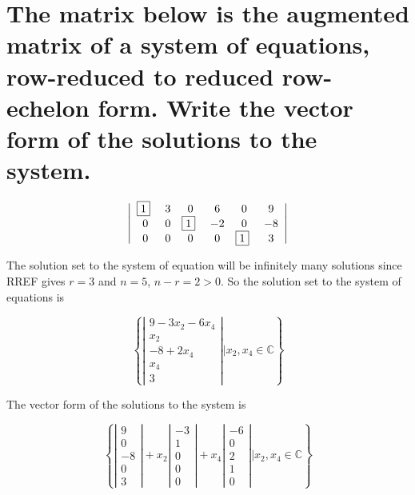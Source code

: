 \documentclass{article}
\begin{document}
\section{The matrix below is the augmented matrix of a system of equations, row-reduced to reduced row-echelon form. Write the vector form of the solutions to the system.}

\[
\left| \begin{array}{cccccc}
 $\boxed{1}$~ & 3 & 0 & 6 & 0 & 9 \\
 0 & 0 & $\boxed{1}$~ & -2 & 0 & -8 \\
 0 & 0 & 0 & 0 & $\boxed{1}$~ & 3
 \end{array} \right|
\]

\bigskip

The solution set to the system of equation will be infinitely many solutions since
RREF gives \(r=3\) and \(n=5\), \(n - r = 2 > 0\).
So the solution set to the system of equations is

\[
\left\{
\left| \begin{array}{c}
9 - 3x_2 - 6x_4 \\
x_2 \\
-8 + 2x_4 \\
x_4 \\
3
\end{array} \right|
|
x_2, x_4\in\mathbb{C}
\right\}
\]

\bigskip

The vector form of the solutions to the system is

\[
\left\{
\left| \begin{array}{c}
9 \\
0 \\
-8 \\
0 \\
3
\end{array} \right|
+
x_2
\left| \begin{array}{c}
-3 \\
1 \\
0 \\
0 \\
0
\end{array} \right|
+
x_4
\left| \begin{array}{c}
-6 \\
0 \\
2 \\
1 \\
0
\end{array} \right|
|
x_2, x_4\in\mathbb{C}
\right\}
\]
\end{document}
